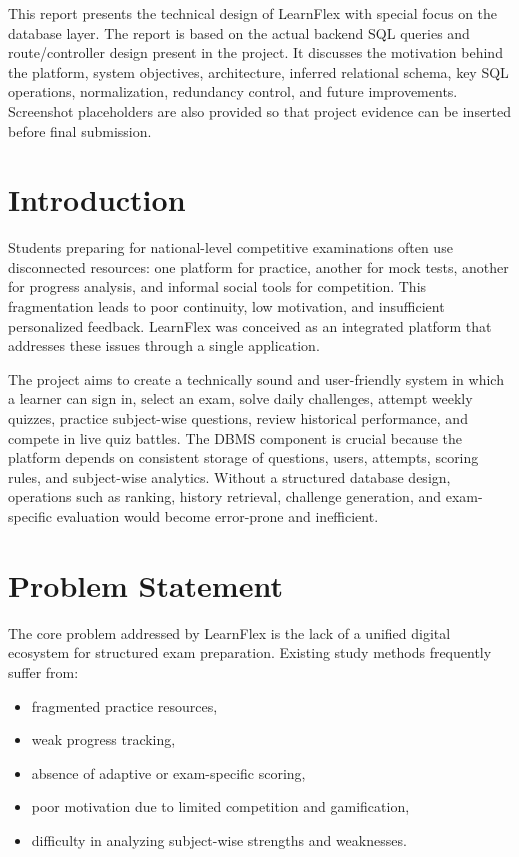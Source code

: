 \documentclass[12pt,a4paper]{article}
\begin{document}
This report presents the technical design of LearnFlex with special focus on the database layer. The report is based on the actual backend SQL queries and route/controller design present in the project. It discusses the motivation behind the platform, system objectives, architecture, inferred relational schema, key SQL operations, normalization, redundancy control, and future improvements. Screenshot placeholders are also provided so that project evidence can be inserted before final submission.

\section{Introduction}
Students preparing for national-level competitive examinations often use disconnected resources: one platform for practice, another for mock tests, another for progress analysis, and informal social tools for competition. This fragmentation leads to poor continuity, low motivation, and insufficient personalized feedback. LearnFlex was conceived as an integrated platform that addresses these issues through a single application.

The project aims to create a technically sound and user-friendly system in which a learner can sign in, select an exam, solve daily challenges, attempt weekly quizzes, practice subject-wise questions, review historical performance, and compete in live quiz battles. The DBMS component is crucial because the platform depends on consistent storage of questions, users, attempts, scoring rules, and subject-wise analytics. Without a structured database design, operations such as ranking, history retrieval, challenge generation, and exam-specific evaluation would become error-prone and inefficient.

\section{Problem Statement}
The core problem addressed by LearnFlex is the lack of a unified digital ecosystem for structured exam preparation. Existing study methods frequently suffer from:

\begin{itemize}[leftmargin=1.5em]
  \item fragmented practice resources,
  \item weak progress tracking,
  \item absence of adaptive or exam-specific scoring,
  \item poor motivation due to limited competition and gamification,
  \item difficulty in analyzing subject-wise strengths and weaknesses.
\end{itemize}
\end{document}
